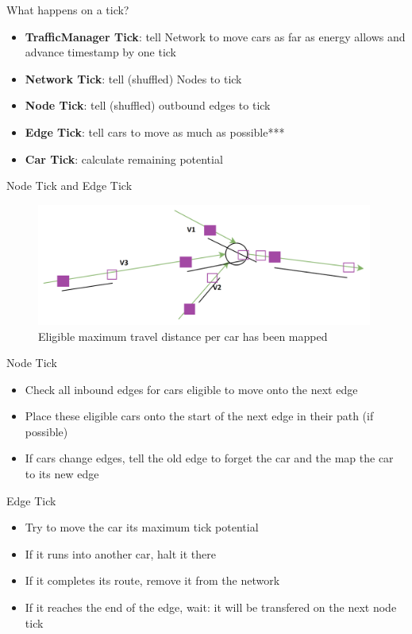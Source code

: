     \begin{frame}{What happens on a tick?}
        \begin{itemize}
            \item \textbf{TrafficManager Tick}:  tell Network to move cars as far as energy allows and advance timestamp by one tick
            \item \textbf{Network Tick}:  tell (shuffled) Nodes to tick
            \item \textbf{Node Tick}:  tell (shuffled) outbound edges to tick
            \item \textbf{Edge Tick}:  tell cars to move as much as possible***
            \item \textbf{Car Tick}:  calculate remaining potential
        \end{itemize}
    \end{frame} 
    
    \begin{frame}{Node Tick and Edge Tick}
            \begin{figure}
            \centering
            \includegraphics[height=4cm]{Images/movement_node_potentials.png}
            \caption{Eligible maximum travel distance per car has been mapped}
        \end{figure}
    \end{frame} 
    
    \begin{frame}{Node Tick}
        \begin{itemize}
            \item Check all inbound edges for cars eligible to move onto the next edge
            \item Place these eligible cars onto the start of the next edge in their path (if possible)
            \item If cars change edges, tell the old edge to forget the car and the map the car to its new edge
        \end{itemize}
    \end{frame} 
    
    \begin{frame}{Edge Tick}
        \begin{itemize}
            \item Try to move the car its maximum tick potential
            \item If it runs into another car, halt it there
            \item If it completes its route, remove it from the network
            \item If it reaches the end of the edge, wait:  it will be transfered on the next node tick
        \end{itemize}
    \end{frame} 
    
